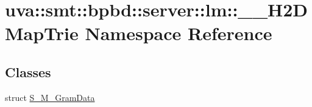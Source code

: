 \hypertarget{namespaceuva_1_1smt_1_1bpbd_1_1server_1_1lm_1_1_____h2_d_map_trie}{}\section{uva\+:\+:smt\+:\+:bpbd\+:\+:server\+:\+:lm\+:\+:\+\_\+\+\_\+\+H2\+D\+Map\+Trie Namespace Reference}
\label{namespaceuva_1_1smt_1_1bpbd_1_1server_1_1lm_1_1_____h2_d_map_trie}
\subsection*{Classes}
\begin{DoxyCompactItemize}
\item 
struct \hyperlink{structuva_1_1smt_1_1bpbd_1_1server_1_1lm_1_1_____h2_d_map_trie_1_1_s___m___gram_data}{S\+\_\+\+M\+\_\+\+Gram\+Data}
\end{DoxyCompactItemize}
